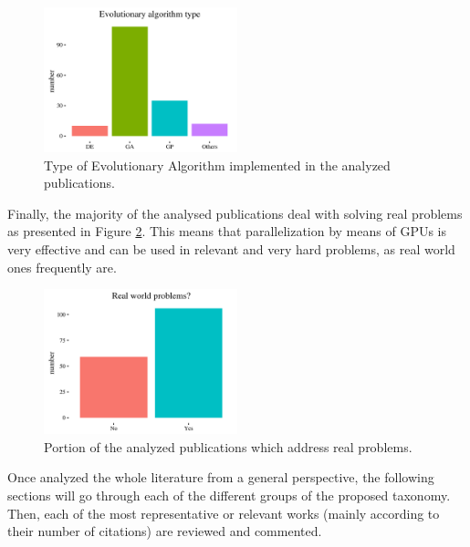 \documentclass{article}
\begin{document}
\begin{figure}[!ht]
\centering
\includegraphics[clip,trim=16 64 16 64,width=0.5\textwidth]{algorithmtype}
\caption{Type of Evolutionary Algorithm implemented in the analyzed publications.}
\label{figure:type_algorithm}
\end{figure}

Finally, the majority of the analysed publications deal with solving real problems as  presented in Figure \ref{figure:type_problem}. This means that parallelization by means of GPUs is very effective and can be used in relevant and very hard problems, as real world ones frequently are.

\begin{figure}[!ht]
\centering
\includegraphics[clip,trim=16 64 16 64,width=0.5\textwidth]{realproblem}
\caption{Portion of the analyzed publications which address real problems.}
\label{figure:type_problem}
\end{figure}


Once analyzed the whole literature from a general perspective, the following sections will go through each of the different groups of the proposed taxonomy. Then, each of the most representative or relevant works (mainly according to their number of citations) are reviewed and commented.

\end{document}
